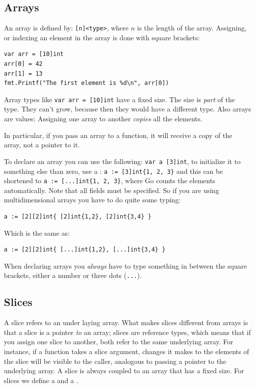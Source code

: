 \subsection{Arrays}
An array is defined by: \verb|[n]<type>|, where $n$ is the length
of the array.
Assigning, or indexing an element in the array is done with square
brackets:
\begin{lstlisting}
var arr = [10]int
arr[0] = 42
arr[1] = 13
fmt.Printf("The first element is %d\n", arr[0])
\end{lstlisting}
Array types like \lstinline{var arr = [10]int} have a fixed size. The
size is \emph{part} of the type.
They can't grow, because then they would have a different type. Also arrays
are values: Assigning one array to another \emph{copies} all the elements.

In particular, if you pass an array to a function, it will receive a
copy of the array, not a pointer to it. 

To declare an array you can use the following: \lstinline{var a [3]int},
to initialize it to something else than zero, use a : \lstinline|a := [3]int{1, 2, 3}| and
this can be shortened to \lstinline|a := [...]int{1, 2, 3}|, where Go counts
the elements automatically. 
Note that all fields must be specified.  So if you are using multidimensional
arrays you have to do quite some typing:
\begin{lstlisting}
a := [2][2]int{ [2]int{1,2}, [2]int{3,4} }
\end{lstlisting}
Which is the same as:
\begin{lstlisting}
a := [2][2]int{ [...]int{1,2}, [...]int{3,4} }
\end{lstlisting}

When declaring arrays you \emph{always} have to type something in
between the square brackets, either a number or three dots (\verb|...|).

\subsection{Slices}
A slice refers to an under laying array. What makes slices different
from
arrays is that a slice is a pointer \emph{to} an array;
slices are reference types, which means that if you assign one slice to
another, both refer to the same underlying array. For instance, if a
function takes a slice argument, changes it makes to the elements of the
slice will be visible to the caller, analogous to passing a pointer to
the underlying array. A slice is always coupled to an array that has
a fixed size. For slices we define a  and a
. 


